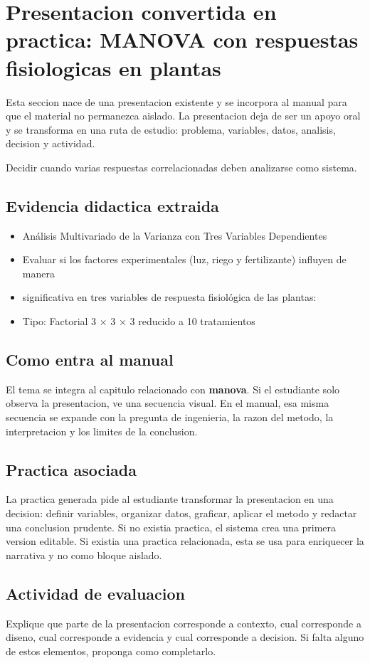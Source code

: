 \section{Presentacion convertida en practica: MANOVA con respuestas fisiologicas en plantas}

Esta seccion nace de una presentacion existente y se incorpora al manual para que el material no permanezca aislado. La presentacion deja de ser un apoyo oral y se transforma en una ruta de estudio: problema, variables, datos, analisis, decision y actividad.

\begin{idea}
Decidir cuando varias respuestas correlacionadas deben analizarse como sistema.
\end{idea}

\subsection{Evidencia didactica extraida}

\begin{itemize}
\item Análisis Multivariado de la Varianza con Tres Variables Dependientes
\item Evaluar si los factores experimentales (luz, riego y fertilizante) influyen de manera
\item significativa en tres variables de respuesta fisiológica de las plantas:
\item Tipo: Factorial 3 × 3 × 3 reducido a 10 tratamientos
\end{itemize}

\subsection{Como entra al manual}

El tema se integra al capitulo relacionado con \textbf{manova}. Si el estudiante solo observa la presentacion, ve una secuencia visual. En el manual, esa misma secuencia se expande con la pregunta de ingenieria, la razon del metodo, la interpretacion y los limites de la conclusion.

\subsection{Practica asociada}

La practica generada pide al estudiante transformar la presentacion en una decision: definir variables, organizar datos, graficar, aplicar el metodo y redactar una conclusion prudente. Si no existia practica, el sistema crea una primera version editable. Si existia una practica relacionada, esta se usa para enriquecer la narrativa y no como bloque aislado.

\subsection{Actividad de evaluacion}

Explique que parte de la presentacion corresponde a contexto, cual corresponde a diseno, cual corresponde a evidencia y cual corresponde a decision. Si falta alguno de estos elementos, proponga como completarlo.
